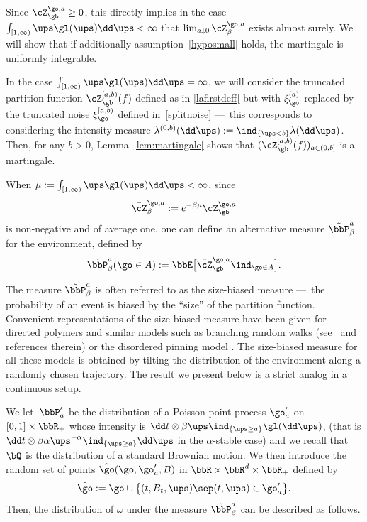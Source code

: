 Since $\cZ_{\gb}^{\go,a}\geq 0$, this directly implies
in the case $\int_{[1,\infty)} \ups \gl(\ups)\dd \ups<\infty$ that $\lim_{a\downarrow 0}\cZ^{\go,a}_{\beta}$ exists almost surely.
We will show that if additionally assumption~\eqref{hyposmall} holds,
the martingale is uniformly integrable.

\begin{rem}
In the case $\int_{[1,\infty)} \ups \gl(\ups)\dd \ups=\infty$,
we will consider the
truncated partition function
$\cZ_{\gb}^{[a,b)}(f)$ defined as in \eqref{lafirstdeff} but with $\xi_{\go}^{(a)}$ replaced by the truncated noise $\xi_{\go}^{[a,b)}$ defined in~\eqref{splitnoise} ---~this corresponds to considering
the intensity measure $\lambda^{(0,b)} (\dd \ups) := \ind_{\{\ups < b\}} \lambda(\dd \ups)$.
Then, for any $b>0$, Lemma~\ref{lem:martingale} shows that $(\cZ_{\gb}^{[a,b)}(f))_{a\in (0,b]}$ is a martingale.
\end{rem}

When $\mu:=\int_{[1,\infty)} \ups \gl(\ups)\dd \ups<\infty$, since
\[
\bar \cZ^{\go,a}_{\beta}:= e^{-\beta \mu} \cZ_{\gb}^{\go,a}
\]
is non-negative and of average one, one can define
an alternative measure $\tilde \bbP^a_{\beta}$ for the environment, defined by
\begin{equation}
\label{tildemeasure}
\tilde \bbP^a_{\beta}(\go\in A):= \bbE\bigl[ \bar \cZ_{\gb}^{\go,a} \ind_{\go\in A}\bigr].
\end{equation}

The measure $\tilde \bbP^a_{\beta}$ is often referred to as the size-biased measure
---~the probability of an event is biased by the ``size'' of the partition function.
Convenient representations of the size-biased measure have been given for directed polymers \cite[Lem.\,1]{Bir04} and similar models such as branching random walks (see~\cite[Ch.\,4]{ShiBRW} and references therein) or the disordered pinning model \cite[\S5.2]{LS17}.
The size-biased measure for all these models is obtained by tilting the distribution
of the environment along a randomly chosen trajectory.
The result we present below is a strict analog in a continuous setup.

We let~$\bbP'_a$ be the distribution of a Poisson point process $\go'_a$ on $[0,1]\times\bbR_+$ whose intensity is $\dd t \otimes \beta \ups \ind_{\{\ups \geq a\}}\gl(\dd \ups)$, (that is $\dd t \otimes \beta\alpha \ups^{-\alpha}\ind_{\{\ups \geq a\}} \dd \ups$ in the $\alpha$-stable case)
and we recall that $\bQ$ is the distribution
of a standard Brownian motion.
We then introduce the random set of points $\hat \go(\go, \go_a',B)$ in $\bbR\times \bbR^{d}\times \bbR_+$ defined by
\begin{equation}
\label{def:hatomega}
\hat \go:= \go \cup \bigl\{ (t,B_t,\ups) \sep (t,\ups)\in \go'_a \bigr\}.
\end{equation}
Then, the distribution of $\omega$ under the measure $\tilde \bbP^a_{\beta}$ can be described as follows.

